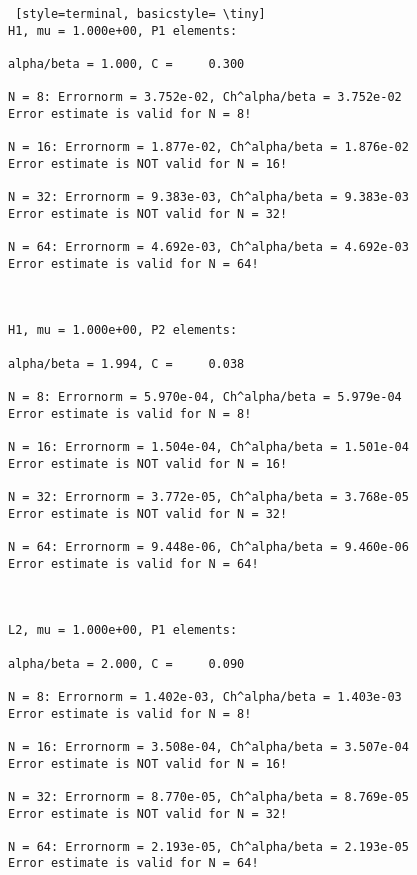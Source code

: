 \documentclass[a4paper,english,12pt,twoside]{article}
\begin{document}
\begin{lstlisting} [style=terminal, basicstyle= \tiny]
H1, mu = 1.000e+00, P1 elements:

alpha/beta = 1.000, C =     0.300

N = 8: Errornorm = 3.752e-02, Ch^alpha/beta = 3.752e-02
Error estimate is valid for N = 8!

N = 16: Errornorm = 1.877e-02, Ch^alpha/beta = 1.876e-02
Error estimate is NOT valid for N = 16!

N = 32: Errornorm = 9.383e-03, Ch^alpha/beta = 9.383e-03
Error estimate is NOT valid for N = 32!

N = 64: Errornorm = 4.692e-03, Ch^alpha/beta = 4.692e-03
Error estimate is valid for N = 64!



H1, mu = 1.000e+00, P2 elements:

alpha/beta = 1.994, C =     0.038

N = 8: Errornorm = 5.970e-04, Ch^alpha/beta = 5.979e-04
Error estimate is valid for N = 8!

N = 16: Errornorm = 1.504e-04, Ch^alpha/beta = 1.501e-04
Error estimate is NOT valid for N = 16!

N = 32: Errornorm = 3.772e-05, Ch^alpha/beta = 3.768e-05
Error estimate is NOT valid for N = 32!

N = 64: Errornorm = 9.448e-06, Ch^alpha/beta = 9.460e-06
Error estimate is valid for N = 64!



L2, mu = 1.000e+00, P1 elements:

alpha/beta = 2.000, C =     0.090

N = 8: Errornorm = 1.402e-03, Ch^alpha/beta = 1.403e-03
Error estimate is valid for N = 8!

N = 16: Errornorm = 3.508e-04, Ch^alpha/beta = 3.507e-04
Error estimate is NOT valid for N = 16!

N = 32: Errornorm = 8.770e-05, Ch^alpha/beta = 8.769e-05
Error estimate is NOT valid for N = 32!

N = 64: Errornorm = 2.193e-05, Ch^alpha/beta = 2.193e-05
Error estimate is valid for N = 64!

\end{lstlisting}
\newpage
\end{document}
